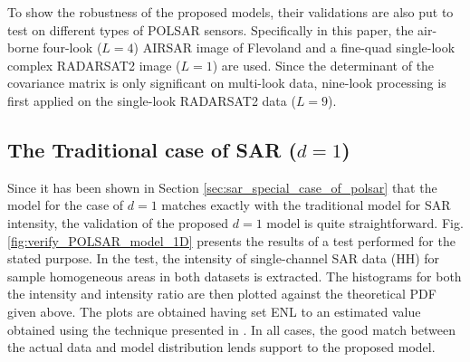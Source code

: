 \documentclass[journal]{IEEEtran}
\begin{document}
To show the robustness of the proposed models, 
  their validations are also put to test on different types of POLSAR sensors.
Specifically in this paper, the air-borne four-look ($L=4$) AIRSAR image of Flevoland and
  a fine-quad single-look complex RADARSAT2 image ($L=1$) are used.
Since the determinant of the covariance matrix is only significant on multi-look data,
  nine-look processing is first applied on the single-look RADARSAT2 data ($L=9$).

\subsection{The Traditional case of SAR ($d=1$)}

Since it has been shown in Section \ref{sec:sar_special_case_of_polsar} that the model for the case of $d=1$ matches exactly with the traditional model for SAR intensity,
  the validation of the proposed $d=1$ model is quite straightforward. %
Fig. \ref{fig:verify_POLSAR_model_1D} presents the results of a test performed for the stated purpose.
In the test, the intensity of single-channel SAR data (HH) for sample homogeneous areas in both datasets is extracted.
The histograms for both the intensity and intensity ratio %
  are then plotted against the theoretical PDF given above.
The plots are obtained having set ENL to an estimated value obtained using the technique presented in \cite{Anfinsen_2009_TGRS_3795}.
In all cases, the good match between the actual data and model distribution lends support to the proposed model. %
\end{document}
